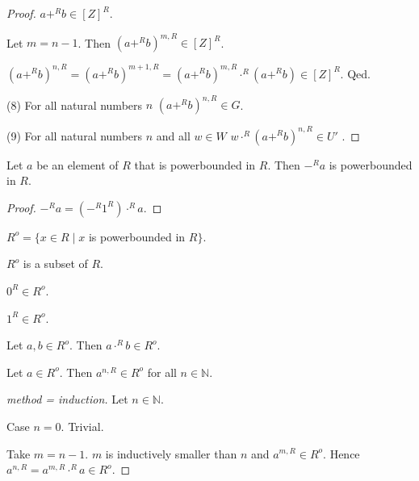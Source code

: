 \documentclass[english,11pt]{article}
\begin{document}
\begin{forthel}
\begin{proof}
$a +^{R} b \in [Z]^{R}$.

Let $m = n - 1$. Then $(a +^{R} b)^{m,R} \in [Z]^{R}$.

$(a +^{R} b)^{n,R} = (a +^{R} b)^{m+1,R}
= (a +^{R} b)^{m,R} \cdot^{R} (a +^{R} b) \in [Z]^{R}$.
Qed.

(8) For all natural numbers $n$ $(a +^{R} b)^{n,R} \in G$.

(9) For all natural numbers $n$ and all $w \in W$ 
$w \cdot^{R} (a +^{R} b)^{n,R} \in U'$ .

\end{proof}

\begin{lemma}[title = L 342]
Let $a$ be an element of $R$ that is powerbounded in $R$.
Then $-^{R} a$ is powerbounded in $R$.
\end{lemma}
\begin{proof}
$-^{R} a = (-^{R} 1^{R}) \cdot^{R} a$.
\end{proof}

\begin{definition}[title = L 310]  $R^o = \{x \in R \mid  x$ is powerbounded in $R\}$. 
\end{definition}

\begin{lemma} $R^o$ is a subset of $R$. \end{lemma}

\begin{lemma}[title = L 320]
$0^{R} \in R^o$.
\end{lemma}

\begin{lemma}[title = L 322] 
$1^{R} \in R^o$.
\end{lemma}

\begin{lemma}[title = L 324]
Let $a,b \in R^o$. Then $a \cdot^{R} b \in R^o$.
\end{lemma}

\begin{lemma}[title = L 324]
Let $a \in R^o$. Then $a^{n,R} \in R^o$ for all $n \in \mathbb{N}$.
\end{lemma}

\begin{proof}[method = induction]
Let $n \in \mathbb{N}$.

Case $n = 0$. Trivial.

Take $m = n - 1$. $m$ is inductively smaller than $n$ and $a^{m,R} \in R^o$.
Hence $a^{n,R} = a^{m,R} \cdot^{R} a \in R^o$.
\end{proof}


\end{forthel}
\end{document}
